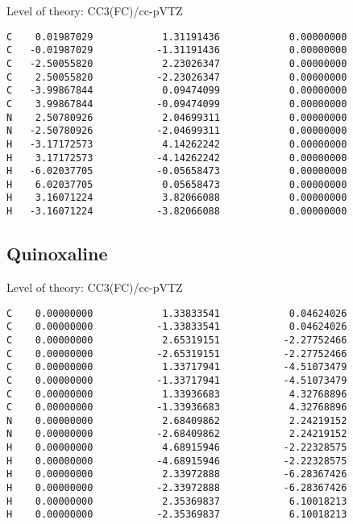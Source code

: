 \documentclass[journal=jctcce,manuscript=article,layout=traditional]{achemso}
\newcommand{\TZ}{cc-pVTZ}
\begin{document}
\begin{singlespace}
Level of theory: CC3(FC)/{\TZ}
\begin{verbatim}
C    0.01987029            1.31191436            0.00000000
C   -0.01987029           -1.31191436            0.00000000
C   -2.50055820            2.23026347            0.00000000
C    2.50055820           -2.23026347            0.00000000
C   -3.99867844            0.09474099            0.00000000
C    3.99867844           -0.09474099            0.00000000
N    2.50780926            2.04699311            0.00000000
N   -2.50780926           -2.04699311            0.00000000
H   -3.17172573            4.14262242            0.00000000
H    3.17172573           -4.14262242            0.00000000
H   -6.02037705           -0.05658473            0.00000000
H    6.02037705            0.05658473            0.00000000
H    3.16071224            3.82066088            0.00000000
H   -3.16071224           -3.82066088            0.00000000
\end{verbatim}
\end{singlespace}


\subsection*{Quinoxaline}

\begin{singlespace}
Level of theory: CC3(FC)/{\TZ}
\begin{verbatim}
C    0.00000000            1.33833541            0.04624026
C    0.00000000           -1.33833541            0.04624026
C    0.00000000            2.65319151           -2.27752466
C    0.00000000           -2.65319151           -2.27752466
C    0.00000000            1.33717941           -4.51073479
C    0.00000000           -1.33717941           -4.51073479
C    0.00000000            1.33936683            4.32768896
C    0.00000000           -1.33936683            4.32768896
N    0.00000000            2.68409862            2.24219152
N    0.00000000           -2.68409862            2.24219152
H    0.00000000            4.68915946           -2.22328575
H    0.00000000           -4.68915946           -2.22328575
H    0.00000000            2.33972888           -6.28367426
H    0.00000000           -2.33972888           -6.28367426
H    0.00000000            2.35369837            6.10018213
H    0.00000000           -2.35369837            6.10018213
\end{verbatim}
\end{singlespace}
\end{document}
